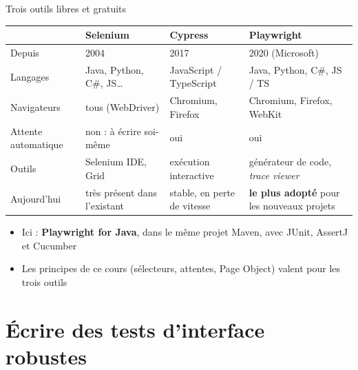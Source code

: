 \documentclass[aspectratio=169,10pt]{beamer}
\begin{document}
\begin{frame}{Trois outils libres et gratuits}
  \footnotesize
  \begin{datacard}
    \begin{tabular}{@{}p{2.3cm}p{3.1cm}p{3.1cm}p{3.3cm}@{}}
      \toprule
      & \textbf{Selenium} & \textbf{Cypress} & \textbf{Playwright} \\
      \midrule
      Depuis & 2004 & 2017 & 2020 (Microsoft) \\[0.5mm]
      Langages & Java, Python, C\#, JS\ldots & JavaScript / TypeScript & Java, Python, C\#, JS / TS \\[0.5mm]
      Navigateurs & tous (WebDriver) & Chromium, Firefox & Chromium, Firefox, WebKit \\[0.5mm]
      Attente automatique & non : à écrire soi-même & oui & oui \\[0.5mm]
      Outils & Selenium IDE, Grid & exécution interactive & générateur de code, \textit{trace viewer} \\[0.5mm]
      Aujourd'hui & très présent dans l'existant & stable, en perte de vitesse & \textbf{le plus adopté} pour les nouveaux projets \\
      \bottomrule
    \end{tabular}
  \end{datacard}
  \vspace{2mm}
  \small
  \begin{itemize}
    \item Ici : \textbf{Playwright for Java}, dans le même projet Maven, avec JUnit, AssertJ et Cucumber
    \item Les principes de ce cours (sélecteurs, attentes, Page Object) valent pour les trois outils
  \end{itemize}
\end{frame}

\section{Écrire des tests d'interface robustes}
\end{document}
